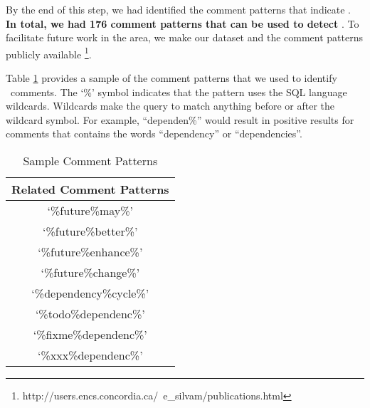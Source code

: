 
By the end of this step, we had identified the comment patterns that indicate \SADTD. \textbf{In total, we had 176 comment patterns that can be used to detect \SADTD}. To facilitate future work in the area, we make our dataset and the comment patterns publicly available \footnote{http://users.encs.concordia.ca/~e\_silvam/publications.html}. 

Table \ref{tab:dictionarySample} provides a sample of the comment patterns that we used to identify \SADTD~comments. 
The `\%' symbol indicates that the pattern uses the SQL language wildcards. Wildcards make the query to match anything before or after the wildcard symbol. For example, ``dependen\%'' would result in positive results for comments that contains the words ``dependency'' or ``dependencies''.

\begin{table}[t!]
    \begin{center}
        \caption{Sample \SADTD Comment Patterns}
        \vspace{-2mm}
        \label{tab:dictionarySample}
        \begin{tabular}{ c }
            \toprule
            \textbf{Related Comment Patterns} \\ 
            \midrule
                 `\%future\%may\%'       \\
                 `\%future\%better\%'  \\
                 `\%future\%enhance\%' \\ 
                 `\%future\%change\%'  \\   
             `\%dependency\%cycle\%'  \\
             `\%todo\%dependenc\%'    \\
             `\%fixme\%dependenc\%'   \\
             `\%xxx\%dependenc\%'    \\
            \bottomrule             
        \end{tabular}
    \end{center}    
\end{table}


